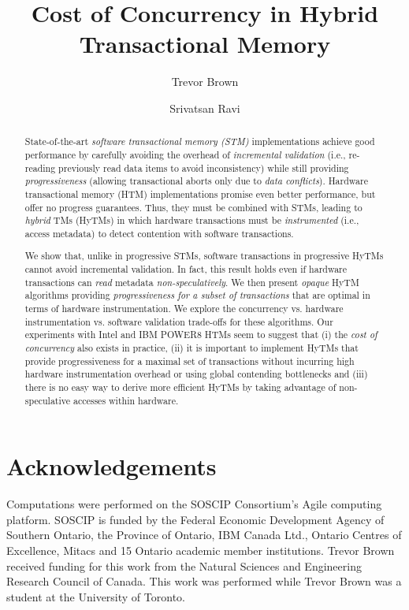 \documentclass[a4paper,UKenglish]{lipics-v2016}
\title{Cost of Concurrency in Hybrid Transactional Memory}
\author[1]{Trevor Brown}
\author[2]{Srivatsan Ravi}
\affil[1]{Technion, Israel Institute of Technology\\
  \texttt{me@tbrown.pro}}
\affil[2]{University of Southern California\\
  \texttt{srivatsr@usc.edu}}
\begin{document}
\maketitle

\begin{abstract}
State-of-the-art \emph{software transactional memory (STM)} implementations achieve 
good performance by carefully avoiding the overhead of \emph{incremental validation}
(i.e., re-reading previously read data items to avoid inconsistency) while
still providing \emph{progressiveness} (allowing transactional aborts only due to \emph{data conflicts}).
Hardware transactional memory (HTM) implementations promise even better performance, 
but offer no progress guarantees.
Thus, they must be combined with STMs, leading to \emph{hybrid} TMs (HyTMs)
in which hardware transactions must be \emph{instrumented} (i.e., access metadata) 
to detect contention with software transactions.

We show that, unlike in progressive STMs, software transactions in progressive HyTMs
cannot avoid incremental validation.
In fact, this result holds even if hardware transactions can \emph{read} metadata 
\emph{non-speculatively}. 
We then present \emph{opaque} HyTM algorithms providing \emph{progressiveness for a subset of transactions} 
that are  optimal in terms of hardware instrumentation. 
We explore the concurrency vs. hardware instrumentation vs. software validation
trade-offs for these algorithms.
Our experiments with Intel and IBM POWER8 HTMs   
seem to suggest that (i) the \emph{cost of concurrency} also exists in practice, 
(ii) it is important to implement HyTMs that provide progressiveness for a maximal set of transactions without incurring high hardware instrumentation overhead or
using global contending bottlenecks and (iii) 
there is no easy way to derive more efficient HyTMs by taking advantage of non-speculative accesses within hardware.

\end{abstract}





%

%


\section*{Acknowledgements}
Computations were performed on the SOSCIP Consortium’s Agile computing platform. 
SOSCIP is funded by the Federal Economic Development Agency of Southern Ontario, the Province of Ontario, IBM Canada Ltd., 
Ontario Centres of Excellence, Mitacs and 15 Ontario academic member institutions. 
Trevor Brown received funding for this work from the Natural Sciences and Engineering Research Council of Canada.
This work was performed while Trevor Brown was a student at the University of Toronto.


\end{document}

